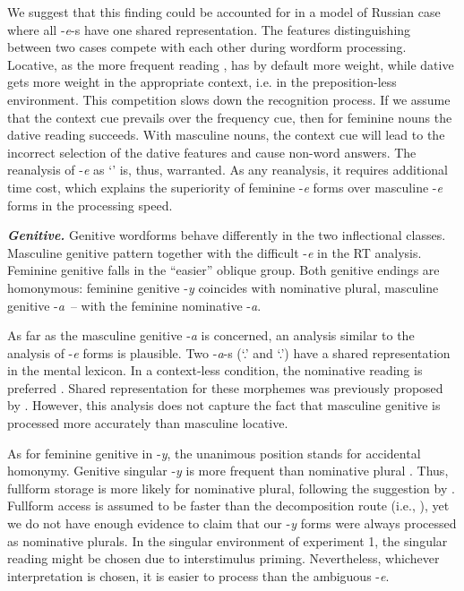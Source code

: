 \documentclass[output=paper, modfonts,newtxmath,hidelinks]{langscibook}
\begin{document}
We suggest that this finding could be accounted for in a model of Russian case where all -\textit{e}-s have one shared representation. The features distinguishing between two cases compete with each other during wordform processing. Locative, as the more frequent reading \citep{samojlova2014frequencies}, has by default more weight, while dative gets more weight in the appropriate context, i.e. in the preposition-less environment. This competition slows down the recognition process. If we assume that the context cue prevails over the frequency cue, then for feminine nouns the dative reading succeeds. With masculine nouns, the context cue will lead to the incorrect selection of the dative features and cause non-word answers. The reanalysis of -\textit{e} as `\locc' is, thus, warranted. As any reanalysis, it requires additional time cost, which explains the superiority of feminine -\textit{e} forms over masculine -\textit{e} forms in the processing speed. 

\textbf{\textit{Genitive.}} Genitive wordforms behave differently in the two inflectional classes. Masculine genitive  pattern together with the difficult -\textit{e} in the RT analysis. Feminine genitive falls in the “easier” oblique group. Both genitive endings are homonymous: feminine genitive -\textit{y} coincides with nominative plural, masculine genitive -\textit{a}~\--- with the feminine nominative -\textit{a}. 

As far as the masculine genitive -\textit{a} is concerned, an analysis similar to the analysis of -\textit{e} forms is plausible. Two -\textit{a}-s (`\genn.\masc' and `\nomm.\fem')
have a shared representation in the mental lexicon. In a context-less condition, the nominative reading is preferred . Shared representation for these morphemes was previously proposed by \citet{muller2004decomposing, wunderlich2004there}. However, this analysis does not capture the fact that masculine genitive is processed more accurately than masculine locative.

As for feminine genitive in -\textit{y}, the unanimous position \citep{muller2004decomposing,wunderlich2004there,wiese2004categories} stands for accidental homonymy. Genitive singular -\textit{y} is more frequent than nominative plural \citep{samojlova2014frequencies}. Thus, fullform storage is more likely for nominative plural, following the suggestion by \citet{bertram2000role}. Fullform access is assumed to be faster than the decomposition route (i.e., \citealt{bertram2000role}), yet we do not have enough evidence to claim that our -\textit{y} forms were always processed as nominative plurals. In the singular environment of experiment 1, the singular reading might be chosen due to interstimulus priming. Nevertheless, whichever interpretation is chosen, it is easier to process than the ambiguous -\textit{e}.
\end{document}
